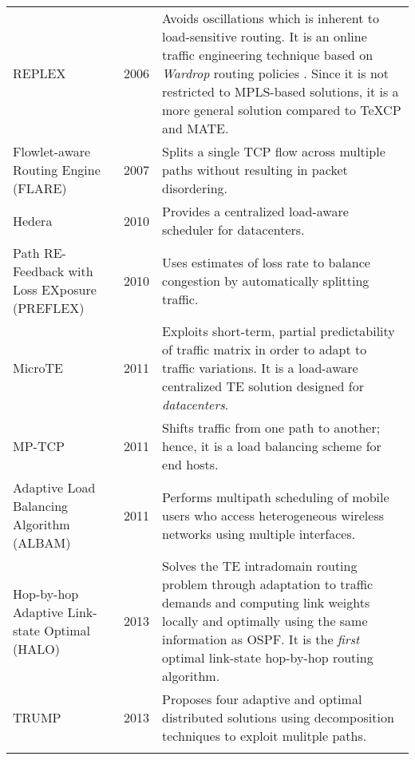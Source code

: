 \documentclass[10pt]{IEEEtran}
\begin{document}
\begin{table*}[!ht]
\begin{tabular}{p{2.7cm}p{1cm}p{13cm}}
\\

REPLEX \cite{fischer2006replex} & 2006 & Avoids oscillations which is inherent to load-sensitive routing. It is an online traffic engineering technique based on \textit{Wardrop} routing policies \cite{wardrop1952road}. Since it is not restricted to MPLS-based solutions, it is a more general solution compared to TeXCP and MATE. \\

Flowlet-aware Routing Engine (FLARE) \cite{kandula2007dynamic} & 2007 & Splits a single TCP flow across multiple paths without resulting in packet disordering. \\

Hedera \cite{al2010hedera} & 2010 & Provides a centralized load-aware scheduler for datacenters. \\

Path RE-Feedback with Loss EXposure (PREFLEX) \cite{araujo2010mutualistic} & 2010 & Uses estimates of loss rate to balance congestion by automatically splitting traffic. \\

MicroTE \cite{benson2011microte} & 2011 & Exploits short-term, partial predictability of traffic matrix in order to adapt to traffic variations. It is a load-aware centralized TE solution designed for \textit{datacenters}. \\

MP-TCP \cite{ford2011architectural} & 2011 & Shifts traffic from one path to another; hence, it is a load balancing scheme for end hosts. \\

Adaptive Load Balancing Algorithm (ALBAM) \cite{zhong2011adaptive} &  2011 & Performs multipath scheduling of mobile users who access heterogeneous wireless networks using multiple interfaces.\\

Hop-by-hop Adaptive Link-state Optimal (HALO) \cite{michael2013optimal} & 2013 & Solves the TE intradomain routing problem through adaptation to traffic demands and computing link weights locally and optimally using the same information as OSPF. It is the \textit{first} optimal link-state hop-by-hop routing algorithm.
\\
TRUMP \cite{he2008multiple} & 2013 & Proposes four adaptive and optimal distributed solutions using decomposition techniques to exploit mulitple paths.\\
  \\


\end{tabular}
\end{table*}
\end{document}
